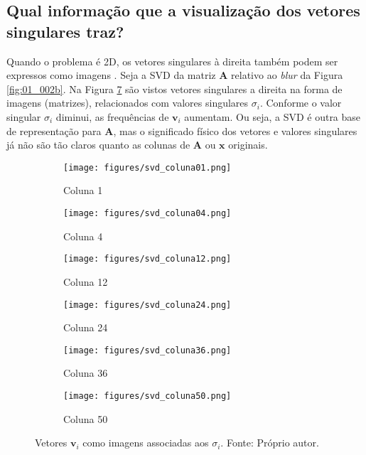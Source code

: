 \subsection{Qual informação que a visualização dos vetores singulares traz?}

Quando o problema é 2D, os vetores singulares à direita também podem ser expressos como imagens \cite[pág. 62]{hansen2006deblurring}. Seja a SVD da matriz $\mathbf{A}$ relativo ao \textit{blur} da Figura \ref{fig:01_002b}. Na Figura \ref{fig:01_006} são vistos vetores singulares a direita na forma de imagens (matrizes), relacionados com valores singulares $\sigma_i$. Conforme o valor singular $\sigma_i$ diminui, as frequências de $\mathbf{v}_i$ aumentam. Ou seja, a SVD é outra base de representação para $\mathbf{A}$, mas o significado físico dos vetores e valores singulares já não são tão claros quanto as colunas de $\mathbf{A}$ ou $\mathbf{x}$ originais. 

\begin{figure}[H]
     \centering
     \begin{subfigure}[b]{0.3\textwidth}
         \centering
         \texttt{[image: figures/svd\_coluna01.png]}
         \caption{Coluna 1}
         \label{fig:01_006a}
     \end{subfigure}
     \hfill
     \begin{subfigure}[b]{0.3\textwidth}
         \centering
                  \texttt{[image: figures/svd\_coluna04.png]}
         \caption{Coluna 4}
         \label{fig:01_006b}
     \end{subfigure}
     \hfill
          \begin{subfigure}[b]{0.3\textwidth}
         \centering
                  \texttt{[image: figures/svd\_coluna12.png]}
         \caption{Coluna 12}
         \label{fig:01_006c}
     \end{subfigure}
          \begin{subfigure}[b]{0.3\textwidth}
         \centering
         \texttt{[image: figures/svd\_coluna24.png]}
         \caption{Coluna 24}
         \label{fig:01_006d}
     \end{subfigure}
     \hfill
     \begin{subfigure}[b]{0.3\textwidth}
         \centering
                  \texttt{[image: figures/svd\_coluna36.png]}
         \caption{Coluna 36}
         \label{fig:01_006e}
     \end{subfigure}
     \hfill
          \begin{subfigure}[b]{0.3\textwidth}
         \centering
                  \texttt{[image: figures/svd\_coluna50.png]}
         \caption{Coluna 50}
         \label{fig:01_006f}
     \end{subfigure}
\caption[Vetores $\mathbf{v}_i$ como imagens associadas aos $\sigma_i$.]{Vetores $\mathbf{v}_i$ como imagens associadas aos $\sigma_i$. Fonte: Próprio autor.}
\label{fig:01_006}
\end{figure}




